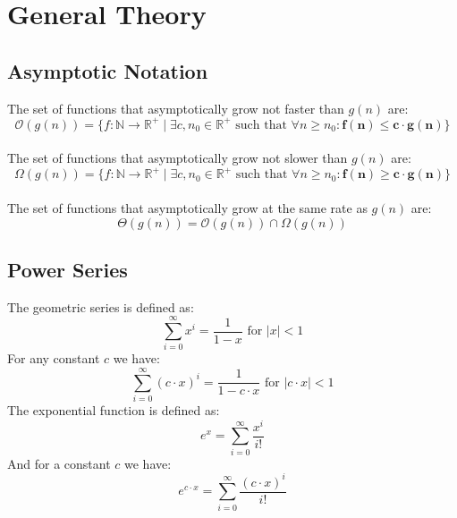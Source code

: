 
\section{General Theory}

\subsection{Asymptotic Notation}

The set of functions that asymptotically grow not faster than \( g \left( n \right) \) are:
\begin{equation*}
    \mathcal{O} \left( g \left( n \right) \right) = \{ 
    f: \mathbb{N} \rightarrow \mathbb{R}^+ \mid \exists c, n_0 \in \mathbb{R}^+ \text{ such that } \forall n \geq n_0: \bm{f(n) \leq c \cdot g(n)  }
    \} 
\end{equation*}
\\
The set of functions that asymptotically grow not slower than \( g \left( n \right) \) are:
\begin{equation*}
    \Omega \left( g \left( n \right) \right) = \{
    f: \mathbb{N} \rightarrow \mathbb{R}^+ \mid \exists c, n_0 \in \mathbb{R}^+ \text{ such that } \forall n \geq n_0: \bm{f(n) \geq c \cdot g(n)}
    \}
\end{equation*}
\\
The set of functions that asymptotically grow at the same rate as \( g \left( n \right) \) are:
\begin{equation*}
    \Theta \left( g \left( n \right) \right) =  \mathcal{O} \left( g \left( n \right) \right) \cap  \Omega \left( g \left( n \right) \right) 
\end{equation*}

\subsection{Power Series}
The geometric series is defined as:
\begin{equation*}
    \sum_{i=0}^{\infty} x^i = \frac{1}{1-x} \text{ for } |x| < 1
\end{equation*}
For any constant \( c \) we have:
\begin{equation*}
    \sum_{i=0}^{\infty} (c \cdot x)^i = \frac{1}{1-c \cdot x} \text{ for } |c \cdot x| < 1
\end{equation*}
The exponential function is defined as:
\begin{equation*}
    e^x = \sum_{i=0}^{\infty} \frac{x^i}{i!}
\end{equation*}
And for a constant \( c \) we have:
\begin{equation*}
    e^{c \cdot x} = \sum_{i=0}^{\infty} \frac{(c \cdot x)^i}{i!}
\end{equation*}